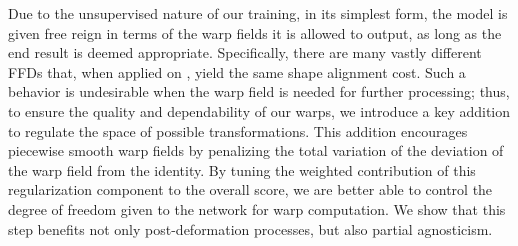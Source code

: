\documentclass[acmtog,timestamp]{acmart}%
\begin{document}
Due to the unsupervised nature of our training, in its simplest form, the model is given free reign in terms of the warp fields it is allowed to output, as long as the end result is deemed appropriate. 
Specifically, there are many vastly different FFDs that, when applied on , yield the same shape alignment cost.
Such a behavior is undesirable when the warp field is needed for further processing; thus, to ensure the quality and dependability of our warps, we introduce a key addition to regulate the space of possible transformations.
This addition encourages piecewise smooth warp fields by penalizing the total variation of the deviation of the warp field from the identity.
By tuning the weighted contribution of this regularization component to the overall score, we are better able to control the degree of freedom given to the network for warp computation. We show that this step benefits not only post-deformation processes, but also partial agnosticism.

\begin{comment}
Training the network to specialize on a given family of shapes for robustness to incompleteness, essentially limits the scope of the system. For any new class of shapes, the network is required to be trained on the appropriate data we wish to support. We demonstrate, however, that for a given set of shapes, our network generalizes well by learning the common expected characteristics of the shapes, without over-fitting or memorization, enabling it to produce plausible deformations on unseen data during test time. See the two bottom rows of Figure~\ref{fig:teaser} for examples of a successful application of our system on shape instances from an entirely different class than the training data. 
\end{comment}\begin{comment}
We henceforth summarize our contributions:
\begin{itemize}
\item We introduce a data-driven self-supervised learning approach for shape alignment, based on Free Form Deformation (FFD).
\item The suggested network is agnostic to missing parts in the shape and generalizes to shapes outside the training set.
\item We introduce a key regularization operation that enforces axial monotonicity of the warp field in order to constrain the FFD and promote smoother deformations.
\item We demonstrate the applicability of our technique for texture and segmentation transfer.
\end{itemize}
\end{comment}\begin{comment}
(caused, for instance, by occlusions or missing parts)
\addnote{We argue that these limitations are due to lack of prior knowledge about the expected shape, which could guide the alignment in regions that are missing and preserve geometric features typical to the class of objects being warped.}
\end{comment}
\end{document}
